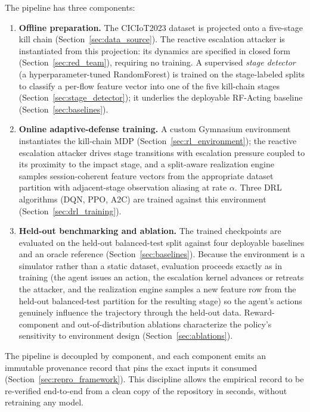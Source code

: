 The pipeline has three components:
\begin{enumerate}
    \item \textbf{Offline preparation.} The CICIoT2023 dataset is projected onto a five-stage kill chain (Section~\ref{sec:data_source}). The reactive escalation attacker is instantiated from this projection: its dynamics are specified in closed form (Section~\ref{sec:red_team}), requiring no training. A supervised \emph{stage detector} (a hyperparameter-tuned RandomForest) is trained on the stage-labeled splits to classify a per-flow feature vector into one of the five kill-chain stages (Section~\ref{sec:stage_detector}); it underlies the deployable RF-Acting baseline (Section~\ref{sec:baselines}).
    \item \textbf{Online adaptive-defense training.} A custom Gymnasium environment instantiates the kill-chain MDP (Section~\ref{sec:rl_environment}); the reactive escalation attacker drives stage transitions with escalation pressure coupled to its proximity to the impact stage, and a split-aware realization engine samples session-coherent feature vectors from the appropriate dataset partition with adjacent-stage observation aliasing at rate $\alpha$. Three DRL algorithms (DQN, PPO, A2C) are trained against this environment (Section~\ref{sec:drl_training}).
    \item \textbf{Held-out benchmarking and ablation.} The trained checkpoints are evaluated on the held-out balanced-test split against four deployable baselines and an oracle reference (Section~\ref{sec:baselines}). Because the environment is a simulator rather than a static dataset, evaluation proceeds exactly as in training (the agent issues an action, the escalation kernel advances or retreats the attacker, and the realization engine samples a new feature row from the held-out balanced-test partition for the resulting stage) so the agent's actions genuinely influence the trajectory through the held-out data. Reward-component and out-of-distribution ablations characterize the policy's sensitivity to environment design (Section~\ref{sec:ablations}).
\end{enumerate}

The pipeline is decoupled by component, and each component emits an immutable provenance record that pins the exact inputs it consumed (Section~\ref{sec:repro_framework}). This discipline allows the empirical record to be re-verified end-to-end from a clean copy of the repository in seconds, without retraining any model.

